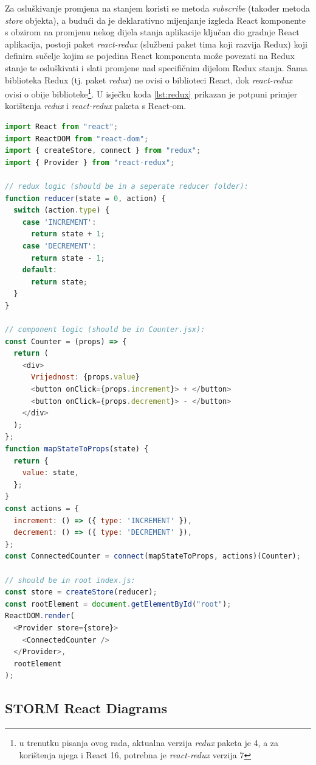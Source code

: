 \documentclass[times, utf8, diplomski, numeric]{fer}
\newcommand{\razmakp}{\vspace{18pt}}
\newcommand{\razmaks}{\vspace{10pt}}
\begin{document}
Za osluškivanje promjena na stanjem koristi se metoda \emph{subscribe} (također metoda \emph{store} objekta), a budući da je deklarativno mijenjanje izgleda React komponente s obzirom na promjenu nekog dijela stanja aplikacije ključan dio gradnje React aplikacija, postoji paket \emph{react-redux} (službeni paket tima koji razvija Redux) koji definira sučelje kojim se pojedina React komponenta može povezati  na Redux stanje te osluškivati i slati promjene nad specifičnim dijelom Redux stanja.
Sama biblioteka Redux (tj. paket \emph{redux}) ne ovisi o biblioteci React, dok \emph{react-redux} ovisi o obije biblioteke\footnote{
    u trenutku pisanja ovog rada, aktualna verzija \emph{redux} paketa je 4, a za korištenja njega i React 16, potrebna je \emph{react-redux} verzija 7
}.
U isječku koda \ref{lst:redux} prikazan je potpuni primjer korištenja \emph{redux} i \emph{react-redux} paketa s React-om.

\razmakp %
\begin{lstlisting}[language=JavaScript, caption={Primjer korištenja Redux biblioteke u React aplikaciji}, label={lst:redux}]
import React from "react";
import ReactDOM from "react-dom";
import { createStore, connect } from "redux";
import { Provider } from "react-redux";

// redux logic (should be in a seperate reducer folder):
function reducer(state = 0, action) {
  switch (action.type) {
    case 'INCREMENT':
      return state + 1;
    case 'DECREMENT':
      return state - 1;
    default:
      return state;
  }
}

// component logic (should be in Counter.jsx):
const Counter = (props) => {
  return (
    <div>
      Vrijednost: {props.value}
      <button onClick={props.increment}> + </button>
      <button onClick={props.decrement}> - </button>
    </div>
  );
};
function mapStateToProps(state) {
  return {
    value: state,
  };
}
const actions = {
  increment: () => ({ type: 'INCREMENT' }),
  decrement: () => ({ type: 'DECREMENT' }),
};
const ConnectedCounter = connect(mapStateToProps, actions)(Counter);

// should be in root index.js:
const store = createStore(reducer);
const rootElement = document.getElementById("root");
ReactDOM.render(
  <Provider store={store}>
    <ConnectedCounter />
  </Provider>,
  rootElement
);
\end{lstlisting}
\razmaks


\razmaks
\subsection{STORM React Diagrams} \label{sec:storm}
\end{document}
